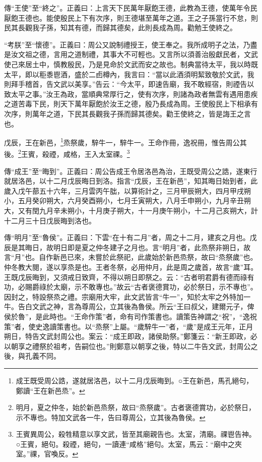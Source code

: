{\noindent\zhuan{}\fzbyks 傳“王使”至“終之”。正義曰：上言天下民萬年厭飽王德，此教為王德，使萬年令民厭飽王德也。能使殷民上下有次序，則王德堪至萬年之道。王之子孫當行不怠，則民其長觀我子孫，知其有德，而歸其德矣，此則長成為周。勸勉王使終之。 \par}

{\noindent\shu{}\fzkt “考朕”至“懷德”。正義曰：周公又說制禮授王，使王奉之。我所成明子之法，乃盡是汝文祖之德，言用之道制禮，其事大不可輕也。又言所以須善治殷獻民者，文武使己來居土中，慎教殷民，乃是見命於文武而安之故也。制典當待太平，我以時既太平，即以秬黍鬯酒，盛於二卣樽內，我言曰：“當以此酒須明絜致敬於文武，我則拜手稽首，告文武以美享。”告云：“今太平，即速告廟，我不敢經宿，則禋告以致太平之事。”汝王為政，當順典常厚行之，使有次序，則諸為政者無雲有遇用患疾之道苦毒下民，則天下萬年厭飽於汝王之德，殷乃長成為周。王使殷民上下相承有次序，則萬年之道，下民其長觀我子孫而歸其德矣。勸王使終之，皆是誨王之言也。 \par}

戊辰，王在新邑，\footnote{成王既受周公誥，遂就居洛邑，以十二月戊辰晦到。○王在新邑，馬孔絕句，鄭讀“王在新邑烝”。}烝祭歲，騂牛一，騂牛一。王命作冊，逸祝冊，惟告周公其後。\footnote{明月，夏之仲冬，始於新邑烝祭，故曰“烝祭歲”。古者褒德賞功，必於祭日，示不專也。特加文武各一牛，告曰尊周公，立其後為魯侯。}王賓，殺禋，咸格，王入太室祼。\footnote{王賓異周公，殺牲精意以享文武，皆至其廟親告也。太室，清廟。祼鬯告神。○王賓，絕句。殺禋，絕句，一讀連“咸格”絕句。太室，馬云：“廟中之夾室。”祼，官喚反。}


{\noindent\zhuan{}\fzbyks 傳“成王”至“晦到”。正義曰：周公告成王令居洛邑為治，王既受周公之誥，遂東行就居洛邑，以十二月戊辰晦日到洛。指言“戊辰，王在新邑”，知其晦日始到者，此歲入戊午蔀五十六年，三月雲丙午朏，以算術計之，三月甲辰朔大，四月甲戌朔小，五月癸卯朔大，六月癸酉朔小，七月壬寅朔大，八月壬申朔小，九月辛丑朔大，又有閏九月辛未朔小，十月庚子朔大，十一月庚午朔小，十二月己亥朔大，計十二月三十日戊辰晦到洛也。 \par}

{\noindent\zhuan{}\fzbyks 傳“明月”至“魯侯”。正義曰：下雲“在十有二月”者，周之十二月，建亥之月也。戊辰是其晦日，故明日即是夏之仲冬建子之月也。言“明月”者，此烝祭非朔日，故言“月”也。自作新邑已來，未嘗於此祭祀，此歲始於新邑烝祭，故曰“烝祭歲”也。仲冬教大閱，遂以享烝是也。王者冬祭，必用仲月，此是周之歲首，故言“歲”耳。王既戊辰晦到，又須戒日致齊，不得以朔日即祭之。云：“古者明君爵有德而祿有功，必賜爵祿於太廟，示不敢專也。”故云“古者褒德賞功，必於祭日，示不專也”。因封之，特設祭烝之禮。宗廟用大牢，此文武皆言“牛一”，知於太牢之外特加一牛。告白文武之神，言為尊周公，立其後為魯侯。所云“王曰叔父，建爾元子，俾侯於魯”，是此時也。“王命作策”者，命有司作策書也。讀策告神謂之“祝”，“逸祝策”者，使史逸讀策書也。以“烝祭”上屬。“歲騂牛一”者，“歲”是成王元年，正月朔日，特告文武封周公也。案云：“成王即政，諸侯助祭。”鄭箋云：“新王即政，必以朝享之禮祭於祖考，告嗣位也。”則鄭意以朝享之後，特以二牛告文武，封周公之後，與孔義不同。 \par}

